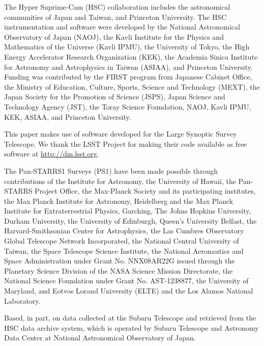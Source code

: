 The Hyper Suprime-Cam (HSC) collaboration includes the astronomical communities of Japan and Taiwan, and Princeton University. The HSC instrumentation and software were developed by the National Astronomical Observatory of Japan (NAOJ), the Kavli Institute for the Physics and Mathematics of the Universe (Kavli IPMU), the University of Tokyo, the High Energy Accelerator Research Organization (KEK), the Academia Sinica Institute for Astronomy and Astrophysics in Taiwan (ASIAA), and Princeton University. Funding was contributed by the FIRST program from Japanese Cabinet Office, the Ministry of Education, Culture, Sports, Science and Technology (MEXT), the Japan Society for the Promotion of Science (JSPS), Japan Science and Technology Agency (JST), the Toray Science Foundation, NAOJ, Kavli IPMU, KEK, ASIAA, and Princeton University. 

This paper makes use of software developed for the Large Synoptic Survey Telescope. We thank the LSST Project for making their code available as free software at  \href{http://dm.lsst.org}{http://dm.lsst.org}.

The Pan-STARRS1 Surveys (PS1) have been made possible through contributions of the Institute for Astronomy, the University of Hawaii, the Pan-STARRS Project Office, the Max-Planck Society and its participating institutes, the Max Planck Institute for Astronomy, Heidelberg and the Max Planck Institute for Extraterrestrial Physics, Garching, The Johns Hopkins University, Durham University, the University of Edinburgh, Queen’s University Belfast, the Harvard-Smithsonian Center for Astrophysics, the Las Cumbres Observatory Global Telescope Network Incorporated, the National Central University of Taiwan, the Space Telescope Science Institute, the National Aeronautics and Space Administration under Grant No. NNX08AR22G issued through the Planetary Science Division of the NASA Science Mission Directorate, the National Science Foundation under Grant No. AST-1238877, the University of Maryland, and Eotvos Lorand University (ELTE) and the Los Alamos National Laboratory.

Based, in part, on data collected at the Subaru Telescope and retrieved from the HSC data archive system, which is operated by Subaru Telescope and Astronomy Data Center at National Astronomical Observatory of Japan.


